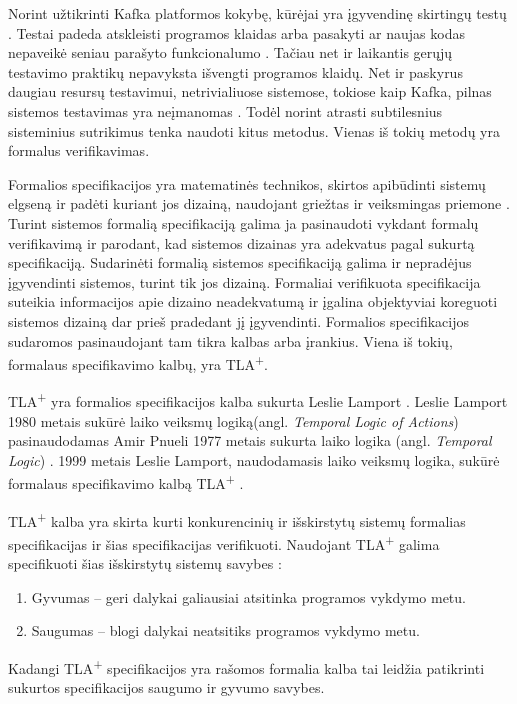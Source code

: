 \documentclass{VUMIFPSmagistrinis}
\begin{document}
		Norint užtikrinti Kafka platformos kokybę, kūrėjai yra įgyvendinę skirtingų testų \cite{kfkGH}.
		Testai padeda atskleisti programos klaidas arba pasakyti ar naujas kodas nepaveikė seniau parašyto funkcionalumo \cite{819971}.
		Tačiau net ir laikantis gerųjų testavimo praktikų nepavyksta išvengti programos klaidų.
		Net ir paskyrus daugiau resursų testavimui, netrivialiuose sistemose, tokiose kaip Kafka, pilnas sistemos testavimas yra neįmanomas \cite{sullivan2004software}.
		Todėl norint atrasti subtilesnius sisteminius sutrikimus tenka naudoti kitus metodus.
		Vienas iš tokių metodų yra formalus verifikavimas.


		Formalios specifikacijos yra matematinės technikos, skirtos apibūdinti sistemų elgseną ir padėti kuriant jos dizainą, naudojant griežtas ir veiksmingas priemone \cite{holzmann1995improvement}.
		Turint sistemos formalią specifikaciją galima ja pasinaudoti vykdant formalų verifikavimą ir parodant, kad sistemos dizainas yra adekvatus pagal sukurtą specifikaciją.
		Sudarinėti formalią sistemos specifikaciją galima ir nepradėjus įgyvendinti sistemos, turint tik jos dizainą. 
		Formaliai verifikuota specifikacija suteikia informacijos apie dizaino neadekvatumą ir įgalina objektyviai koreguoti sistemos dizainą dar prieš pradedant jį įgyvendinti.
		Formalios specifikacijos sudaromos pasinaudojant tam tikra kalbas arba įrankius.
		Viena iš tokių, formalaus specifikavimo kalbų, yra TLA\textsuperscript{+}.
		

		TLA\textsuperscript{+} yra formalios specifikacijos kalba sukurta Leslie Lamport \cite{lamport2002specifying}.
		Leslie Lamport 1980 metais sukūrė laiko veiksmų logiką(angl. {\it Temporal Logic of Actions}) \cite{10.1145/177492.177726} pasinaudodamas Amir Pnueli 1977 metais sukurta laiko logika (angl. {\it Temporal Logic}) \cite{4567924}.
		1999 metais Leslie Lamport, naudodamasis laiko veiksmų logika, sukūrė formalaus specifikavimo kalbą TLA\textsuperscript{+} \cite{lamport2002specifying}.
		

TLA\textsuperscript{+} kalba yra skirta kurti konkurencinių ir išskirstytų sistemų formalias specifikacijas ir šias specifikacijas verifikuoti.
		Naudojant TLA\textsuperscript{+} galima specifikuoti šias išskirstytų sistemų savybes \cite{1702415} :
		\begin{enumerate}
			\item{Gyvumas -- geri dalykai galiausiai atsitinka programos vykdymo metu. }
			\item{Saugumas -- blogi dalykai neatsitiks programos vykdymo metu.}
		\end{enumerate}
		Kadangi TLA\textsuperscript{+} specifikacijos yra rašomos formalia kalba tai leidžia patikrinti sukurtos specifikacijos saugumo ir gyvumo savybes.
		
\end{document}
